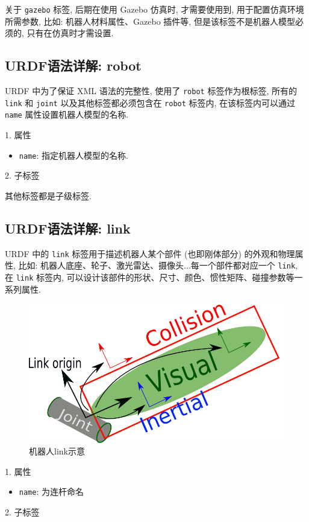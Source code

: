 \documentclass[openany, fontset=windowsold]{ctexbook}
\theoremstyle{kaiti}
\theoremstyle{normal}
\begin{document}
关于 \verb|gazebo| 标签, 后期在使用 Gazebo 仿真时, 才需要使用到, 用于配置仿真环境所需参数, 比如: 机器人材料属性、Gazebo 插件等, 但是该标签不是机器人模型必须的, 只有在仿真时才需设置.

\subsection{URDF语法详解: robot}

URDF 中为了保证 XML 语法的完整性, 使用了 \verb|robot| 标签作为根标签, 所有的 \verb|link| 和 \verb|joint| 以及其他标签都必须包含在 \verb|robot| 标签内, 在该标签内可以通过 \verb|name| 属性设置机器人模型的名称.

1. 属性

\begin{itemize}
  \item \verb|name|: 指定机器人模型的名称.
\end{itemize}

2. 子标签

其他标签都是子级标签.

\subsection{URDF语法详解: link}

URDF 中的 \verb|link| 标签用于描述机器人某个部件 (也即刚体部分) 的外观和物理属性, 比如: 机器人底座、轮子、激光雷达、摄像头...每一个部件都对应一个 \verb|link|, 在 \verb|link| 标签内, 可以设计该部件的形状、尺寸、颜色、惯性矩阵、碰撞参数等一系列属性.

\begin{figure}[!ht]
  \centering
  \includegraphics[width=.3\textwidth]{robot_link.png}
  \caption{机器人link示意}
  \label{fig:robot_link}
\end{figure}

1. 属性

\begin{itemize}
  \item \verb|name|: 为连杆命名
\end{itemize}

2. 子标签
\end{document}
